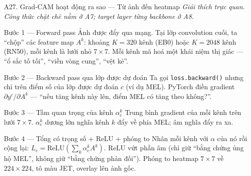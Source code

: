 \documentclass[10pt, aspectratio=169]{beamer}
\begin{document}
\begin{frame}{A27. Grad-CAM hoạt động ra sao --- Từ ảnh đến heatmap}
    \footnotesize
    \textit{Giải thích trực quan. Công thức chặt chẽ nằm ở A7; target layer từng backbone ở A8.}
    \vspace{0.2cm}

    \begin{block}{Bước 1 --- Forward pass}
        \scriptsize
        Ảnh được đẩy qua mạng. Tại lớp convolution cuối, ta ``chộp'' các feature map $A^k$: khoảng $K=320$ kênh (EB0) hoặc $K=2048$ kênh (RN50), mỗi kênh là lưới nhỏ $7 \times 7$. Mỗi kênh mã hoá một khái niệm thị giác --- ``ổ sắc tố tối'', ``viền vòng cung'', ``vệt kẻ''.
    \end{block}

    \begin{block}{Bước 2 --- Backward pass qua lớp được dự đoán}
        \scriptsize
        Ta gọi \texttt{loss.backward()} nhưng chỉ trên điểm số của lớp được dự đoán $c$ (ví dụ MEL). PyTorch điền gradient $\partial y^c / \partial A^k$ --- ``nếu tăng kênh này lên, điểm MEL có tăng theo không?''.
    \end{block}

    \begin{block}{Bước 3 --- Tầm quan trọng của kênh $\alpha_c^k$}
        \scriptsize
        Trung bình gradient của mỗi kênh trên lưới $7 \times 7$. $\alpha_c^k$ dương lớn nghĩa kênh $k$ đẩy về phía MEL; âm nghĩa đẩy ra xa.
    \end{block}

    \begin{block}{Bước 4 --- Tổng có trọng số + ReLU + phóng to}
        \scriptsize
        Nhân mỗi kênh với $\alpha$ của nó rồi cộng lại: $L_c = \mathrm{ReLU}(\sum_k \alpha_c^k A^k)$. ReLU vứt phần âm (chỉ giữ ``bằng chứng ủng hộ MEL'', không giữ ``bằng chứng phản đối''). Phóng to heatmap $7 \times 7$ về $224 \times 224$, tô màu JET, overlay lên ảnh gốc.
    \end{block}

\end{frame}
\end{document}

